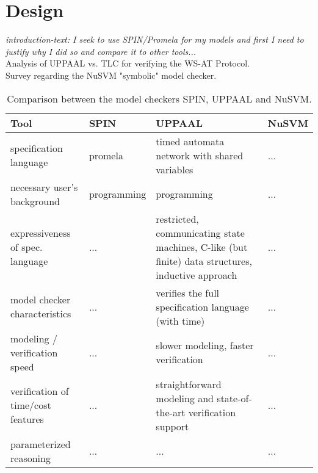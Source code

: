 \chapter{Design}


\textit{introduction-text: I seek to use SPIN/Promela for my models and first I need to justify why I did so and compare it to other tools...} \\



Analysis of UPPAAL vs. TLC for verifying the WS-AT Protocol. \cite{uppaal_analysis} \\




Survey regarding the NuSVM "symbolic" model checker.\cite{NuSVM_modelchecker}



\begin{table}[H]
\centering
\begin{tabular}{| p{3cm} || p{3cm} | p{3cm} | p{3cm} |} \hline
Tool 
	& \textbf{SPIN} 
    & \textbf{UPPAAL}
    & \textbf{NuSVM}
    \\ \hline\hline
specification language 
	& promela
    & timed automata network with shared variables
    & ...
    \\ \hline
necessary user's background 
	& programming
    & programming
    & ...
    \\ \hline
expressiveness of spec. language 
	& ...
    & restricted, communicating state machines, C-like (but finite) data structures, inductive approach
    & ...
    \\ \hline
model checker characteristics 
	& ...
    & verifies the full specification language (with time)
    & ...
    \\ \hline
modeling / verification speed 
	& ...
    & slower modeling, faster verification
    & ...
    \\ \hline
verification of time/cost features
	& ...
    & straightforward modeling and state-of-the-art verification support
    & ...
    \\ \hline
parameterized reasoning
	& ...
    & ...
    & ...
    \\ \hline
\end{tabular}
\caption{Comparison between the model checkers SPIN, UPPAAL and NuSVM.}\cite{compare_spin_uppaal}
\end{table}

